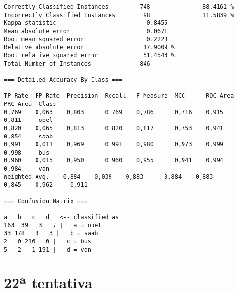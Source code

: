 \documentclass[
	article,			%
	11pt,				%
	oneside,			%
	a4paper,			%
	english,			%
	brazil,				%
	sumario=tradicional
	]{abntex2}
\begin{document}
\begin{lstlisting}
Correctly Classified Instances         748               88.4161 %
Incorrectly Classified Instances        98               11.5839 %
Kappa statistic                          0.8455
Mean absolute error                      0.0671
Root mean squared error                  0.2228
Relative absolute error                 17.9009 %
Root relative squared error             51.4543 %
Total Number of Instances              846     

=== Detailed Accuracy By Class ===

TP Rate  FP Rate  Precision  Recall   F-Measure  MCC      ROC Area  PRC Area  Class
0,769    0,063    0,803      0,769    0,786      0,716    0,915     0,811     opel
0,820    0,065    0,813      0,820    0,817      0,753    0,941     0,854     saab
0,991    0,011    0,969      0,991    0,980      0,973    0,999     0,998     bus
0,960    0,015    0,950      0,960    0,955      0,941    0,994     0,984     van
Weighted Avg.    0,884    0,039    0,883      0,884    0,883      0,845    0,962     0,911     

=== Confusion Matrix ===

a   b   c   d   <-- classified as
163  39   3   7 |   a = opel
33 178   3   3 |   b = saab
2   0 216   0 |   c = bus
5   2   1 191 |   d = van

\end{lstlisting}

\section{22ª tentativa}
\end{document}

